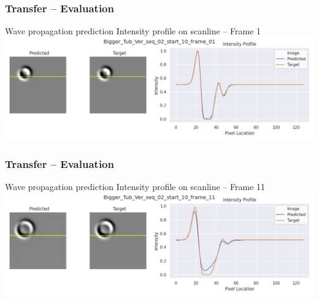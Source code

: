 \begin{frame}
    \frametitle{Transfer -- Evaluation}

Wave propagation prediction \newline
Intensity profile on scanline -- Frame 1\\[\baselineskip]

\includegraphics[width=\textwidth, height=.55\textheight]{./Ressourcen/Praesentation/Bilder/WaveTransfer/DFP/Bigger_Tub_Ver_seq_02_start_10_frame_01.png}%

\end{frame}
\clearpage
\begin{frame}
    \frametitle{Transfer -- Evaluation}

Wave propagation prediction \newline
Intensity profile on scanline -- Frame 11\\[\baselineskip]

\includegraphics[width=\textwidth, height=.55\textheight]{./Ressourcen/Praesentation/Bilder/WaveTransfer/DFP/Bigger_Tub_Ver_seq_02_start_10_frame_11.png}%

\end{frame}
\clearpage
